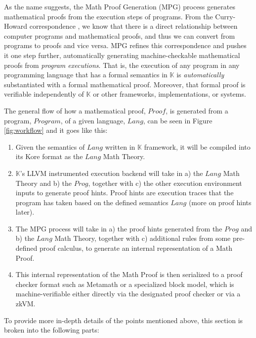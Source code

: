 \documentclass{article}
\theoremstyle{plain}
\theoremstyle{definition}
\newcommand{\K}{$\mathbb{K}$\xspace}
\begin{document}
As the name suggests, the Math Proof Generation (MPG) process generates mathematical proofs from the execution steps of programs.
From the Curry-Howard correspondence \cite{howard1980formulae}, we know that there is a direct relationship between computer programs and mathematical proofs, and thus we can convert from programs to proofs and vice versa.
MPG refines this correspondence and pushes it one step further, automatically generating machine-checkable mathematical proofs from \textit{program executions}.
That is, the execution of any program in any programming language that has a formal semantics in \K is \textit{automatically} substantiated with a formal mathematical proof.  Moreover, that formal proof is verifiable independently of \K or other frameworks, implementations, or systems.

The general flow of how a mathematical proof, $Proof$, is generated from a program, $Program$, of a given language, $Lang$, can be seen in Figure \ref{fig:workflow} and it goes like this:

\begin{enumerate}
    \item Given the semantics of $Lang$ written in \K framework, it will be compiled into its Kore format as the $Lang$ Math Theory.
    \item \K's LLVM instrumented execution backend will take in a) the $Lang$ Math Theory and b) the $Prog$, together with c) the other execution environment inputs to generate proof hints. Proof hints are execution traces that the program has taken based on the defined semantics $Lang$ (more on proof hints later).
    \item The MPG process will take in a) the proof hints generated from the $Prog$ and b) the $Lang$ Math Theory, together with c) additional rules from some pre-defined proof calculus, to generate an internal representation of a Math Proof.
    \item This internal representation of the Math Proof is then serialized to a proof checker format such as Metamath or a specialized block model, which is machine-verifiable either directly via the designated proof checker or via a zkVM.
\end{enumerate}

To provide more in-depth details of the points mentioned above, this section is broken into the following parts:
\end{document}
